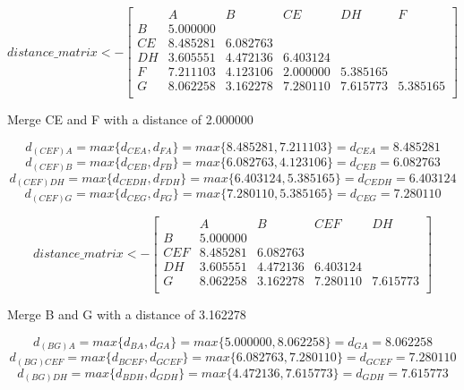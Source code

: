 \documentclass{report}
\begin{document}
\[
  distance\_matrix <- 
  \begin{bmatrix}
        & A        & B        & CE       & DH       & F        \\
    B   & 5.000000 &          &          &          &          \\
    CE  & 8.485281 & 6.082763 &          &          &          \\
    DH  & 3.605551 & 4.472136 & 6.403124 &          &          \\
    F   & 7.211103 & 4.123106 & 2.000000 & 5.385165 &          \\
    G   & 8.062258 & 3.162278 & 7.280110 & 7.615773 & 5.385165 \\
  \end{bmatrix}
\]

Merge CE and F with a distance of 2.000000

\begin{equation}
  d_{(CEF)A} = max\{d_{CEA}, d_{FA}\} = max\{8.485281, 7.211103\} = d_{CEA} = 8.485281
\end{equation}
\begin{equation}
  d_{(CEF)B} = max\{d_{CEB}, d_{FB}\} = max\{6.082763, 4.123106\} = d_{CEB} = 6.082763
\end{equation}
\begin{equation}
  d_{(CEF)DH} = max\{d_{CEDH}, d_{FDH}\} = max\{6.403124, 5.385165\} = d_{CEDH} = 6.403124
\end{equation}
\begin{equation}
  d_{(CEF)G} = max\{d_{CEG}, d_{FG}\} = max\{7.280110, 5.385165\} = d_{CEG} = 7.280110
\end{equation}

\[
  distance\_matrix <- 
  \begin{bmatrix}
         & A        & B        & CEF      & DH       \\
    B    & 5.000000 &          &          &          \\
    CEF  & 8.485281 & 6.082763 &          &          \\
    DH   & 3.605551 & 4.472136 & 6.403124 &          \\
    G    & 8.062258 & 3.162278 & 7.280110 & 7.615773 \\
  \end{bmatrix}
\]

Merge B and G with a distance of 3.162278

\begin{equation}
  d_{(BG)A} = max\{d_{BA}, d_{GA}\} = max\{5.000000, 8.062258\} = d_{GA} = 8.062258
\end{equation}
\begin{equation}
  d_{(BG)CEF} = max\{d_{BCEF}, d_{GCEF}\} = max\{6.082763, 7.280110\} = d_{GCEF} = 7.280110
\end{equation}
\begin{equation}
  d_{(BG)DH} = max\{d_{BDH}, d_{GDH}\} = max\{4.472136, 7.615773\} = d_{GDH} = 7.615773
\end{equation}
\end{document}
